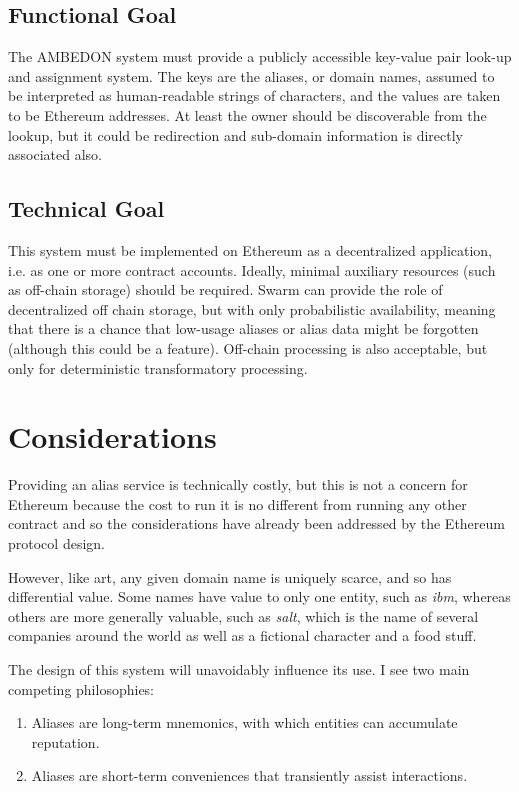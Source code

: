 \documentclass[10pt,a4paper]{article}
\begin{document}
\subsection*{Functional Goal}
The AMBEDON system must provide a publicly accessible key-value pair look-up and assignment system. The keys are the aliases, or domain names, assumed to be interpreted as human-readable strings of characters, and the values are taken to be Ethereum addresses. At least the owner should be discoverable from the lookup, but it could be redirection and sub-domain information is directly associated also.

\subsection*{Technical Goal}
This system must be implemented on Ethereum as a decentralized application, i.e. as one or more contract accounts. Ideally, minimal auxiliary resources (such as off-chain storage) should be required. Swarm can provide the role of decentralized off chain storage, but with only probabilistic availability, meaning that there is a chance that low-usage aliases or alias data might be forgotten (although this could be a feature). Off-chain processing is also acceptable, but only for deterministic transformatory processing.

\section*{Considerations}

Providing an alias service is technically costly, but this is not a concern for Ethereum because the cost to run it is no different from running any other contract and so the considerations have already been addressed by the Ethereum protocol design.

However, like art, any given domain name is uniquely scarce, and so has differential value. Some names have value to only one entity, such as {\it ibm}, whereas others are more generally valuable, such as {\it salt}, which is the name of several companies around the world as well as a fictional character and a food stuff.

The design of this system will unavoidably influence its use. I see two main competing philosophies:

\begin{enumerate}
\item Aliases are long-term mnemonics, with which entities can accumulate reputation.
\item Aliases are short-term conveniences that transiently assist interactions.
\end{enumerate}
\end{document}
